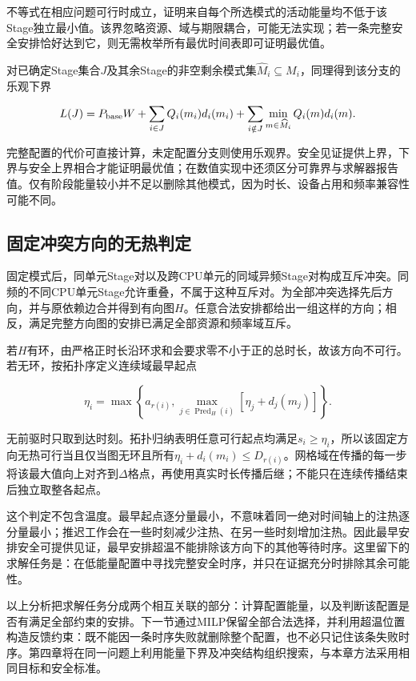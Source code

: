 不等式在相应问题可行时成立，证明来自每个所选模式的活动能量均不低于该Stage独立最小值。该界忽略资源、域与期限耦合，可能无法实现；若一条完整安全安排恰好达到它，则无需枚举所有最优时间表即可证明最优值。

对已确定Stage集合\(J\)及其余Stage的非空剩余模式集\(\widehat M_i\subseteq M_i\)，同理得到该分支的乐观下界

\begin{equation}
L(J)=P_{\rm base}W+\sum_{i\in J}Q_i(m_i)d_i(m_i)
+\sum_{i\notin J}\min_{m\in\widehat M_i}Q_i(m)d_i(m).
\label{eq:ch3-19}
\end{equation}

完整配置的代价可直接计算，未定配置分支则使用乐观界。安全见证提供上界，下界与安全上界相合才能证明最优值；在数值实现中还须区分可靠界与求解器报告值。仅有阶段能量较小并不足以删除其他模式，因为时长、设备占用和频率兼容性可能不同。

\subsection{固定冲突方向的无热判定}

固定模式后，同单元Stage对以及跨CPU单元的同域异频Stage对构成互斥冲突。同频的不同CPU单元Stage允许重叠，不属于这种互斥对。为全部冲突选择先后方向，并与原依赖边合并得到有向图\(H\)。任意合法安排都给出一组这样的方向；相反，满足完整方向图的安排已满足全部资源和频率域互斥。

若\(H\)有环，由严格正时长沿环求和会要求零不小于正的总时长，故该方向不可行。若无环，按拓扑序定义连续域最早起点

\begin{equation}
\eta_i=\max\left\{a_{r(i)},\max_{j\in\operatorname{Pred}_H(i)}[\eta_j+d_j(m_j)]\right\}.
\label{eq:ch3-20}
\end{equation}

无前驱时只取到达时刻。拓扑归纳表明任意可行起点均满足\(s_i\ge\eta_i\)，所以该固定方向无热可行当且仅当图无环且所有\(\eta_i+d_i(m_i)\le D_{r(i)}\)。网格域在传播的每一步将该最大值向上对齐到\(\Delta\)格点，再使用真实时长传播后继；不能只在连续传播结束后独立取整各起点。

这个判定不包含温度。最早起点逐分量最小，不意味着同一绝对时间轴上的注热逐分量最小；推迟工作会在一些时刻减少注热、在另一些时刻增加注热。因此最早安排安全可提供见证，最早安排超温不能排除该方向下的其他等待时序。这里留下的求解任务是：在低能量配置中寻找完整安全时序，并只在证据充分时排除其余可能性。

以上分析把求解任务分成两个相互关联的部分：计算配置能量，以及判断该配置是否有满足全部约束的安排。下一节通过MILP保留全部合法选择，并利用超温位置构造反馈约束：既不能因一条时序失败就删除整个配置，也不必只记住该条失败时序。第四章将在同一问题上利用能量下界及冲突结构组织搜索，与本章方法采用相同目标和安全标准。


